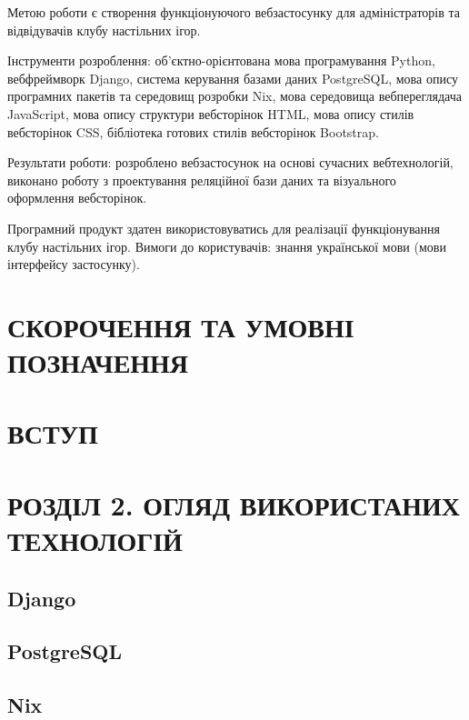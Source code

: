 \documentclass[a4paper, 14pt]{extarticle}
\begin{document}
  Метою роботи є створення функціонуючого вебзастосунку для адміністраторів та
  відвідувачів клубу настільних ігор.

  Інструменти розроблення: об'єктно-орієнтована мова програмування Python,
  вебфреймворк Django, система керування базами даних PostgreSQL, мова опису програмних
  пакетів та середовищ розробки Nix, мова середовища вебпереглядача JavaScript, мова
  опису структури вебсторінок HTML, мова опису стилів вебсторінок CSS, бібліотека
  готових стилів вебсторінок Bootstrap.

  Результати роботи: розроблено вебзастосунок на основі сучасних вебтехнологій,
  виконано роботу з проектування реляційної бази даних та візуального оформлення
  вебсторінок.

  Програмний продукт здатен використовуватись для реалізації функціонування
  клубу настільних ігор. Вимоги до користувачів: знання української мови (мови
  інтерфейсу застосунку).

  \pagebreak

  \tableofcontents
  \newpage

  \section{СКОРОЧЕННЯ ТА УМОВНІ ПОЗНАЧЕННЯ}
  \section{ВСТУП}
  \section{РОЗДІЛ 2. ОГЛЯД ВИКОРИСТАНИХ ТЕХНОЛОГІЙ}
  \subsection{Django}
  \subsection{PostgreSQL}
  \subsection{Nix}
\end{document}
